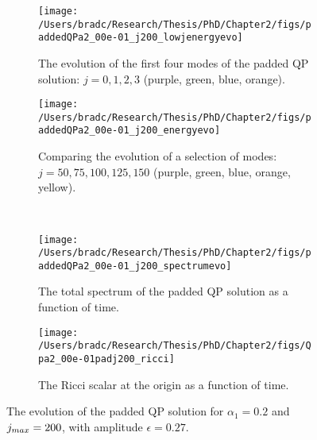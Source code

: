 \documentclass[../PhD.tex]{subfiles}
\begin{document}
\begin{figure}[ht]
	\centering
	\begin{subfigure}[t]{0.45\textwidth}
		\texttt{[image: /Users/bradc/Research/Thesis/PhD/Chapter2/figs/paddedQPa2\_00e-01\_j200\_lowjenergyevo]}
		\caption{The evolution of the first four modes of the padded QP solution: {$j=0,1,2,3$} (purple, green, blue, orange).}
	\end{subfigure}
	\hfill
	\begin{subfigure}[t]{0.45\textwidth}
		\texttt{[image: /Users/bradc/Research/Thesis/PhD/Chapter2/figs/paddedQPa2\_00e-01\_j200\_energyevo]}
		\caption{Comparing the evolution of a selection of modes: {$j= 50, 75, 100, 125, 150$} (purple, green, blue, orange, yellow).}
	\end{subfigure}
	\\
	\begin{subfigure}[t]{0.45\textwidth}
		\texttt{[image: /Users/bradc/Research/Thesis/PhD/Chapter2/figs/paddedQPa2\_00e-01\_j200\_spectrumevo]}
		\caption{The total spectrum of the padded QP solution as a function of time.}
		\label{fig: paddedqp_fullspecevo}
	\end{subfigure}
	\:\:\:
	\begin{subfigure}[t]{0.45\textwidth}
		\texttt{[image: /Users/bradc/Research/Thesis/PhD/Chapter2/figs/Qpa2\_00e-01padj200\_ricci]}
		\caption{The Ricci scalar at the origin as a function of time.}
		\label{fig: Qpa2_00e-01padj200_ricci}
	\end{subfigure}
	\caption[The evolution of a padded QP solution]{The evolution of the padded QP solution for $\alpha_1 =0.2$ and $j_{max} = 200$, with amplitude $\epsilon=0.27$.}
	\label{fig:paddedqpevo}
\end{figure}

\end{document}
